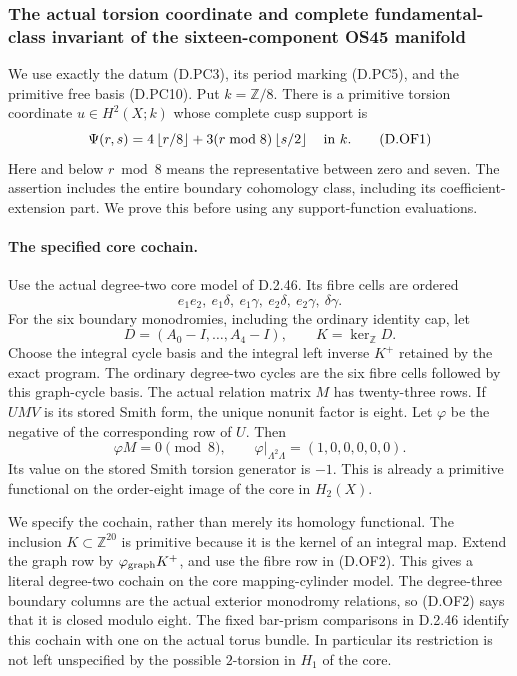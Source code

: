 \subsubsection*{The actual torsion coordinate and complete fundamental-class
invariant of the sixteen-component OS45 manifold}
We use exactly the datum (D.PC3), its period marking (D.PC5), and the
primitive free basis (D.PC10). Put \(k=\mathbb Z/8\).
There is a primitive torsion coordinate
\(u\in H^2(X;k)\) whose complete cusp support is
\[
 \Psi(r,s)=4\left\lfloor r/8\right\rfloor
       +3(r\bmod8)\left\lfloor s/2\right\rfloor
                                      \quad\hbox{in }k.       \tag{D.OF1}
\]
Here and below \(r\bmod8\) means the representative between zero and
seven. The assertion includes the entire boundary cohomology class,
including its coefficient-extension part. We prove this before using
any support-function evaluations.

\paragraph{The specified core cochain.}
Use the actual degree-two core model of D.2.46. Its fibre cells are
ordered
\[
 e_1e_2,\ e_1\delta,\ e_1\gamma,\ e_2\delta,\
                                      e_2\gamma,\ \delta\gamma.
\]
For the six boundary monodromies, including the ordinary identity cap,
let
\[
 D=(A_0-I,\ldots,A_4-I),\qquad K=\ker_{\mathbb Z}D.
\]
Choose the integral cycle basis and the integral left inverse \(K^+\)
retained by the exact program. The ordinary degree-two cycles are the
six fibre cells followed by this graph-cycle basis. The actual
relation matrix \(M\) has twenty-three rows. If
\(UMV\) is its stored Smith form, the unique nonunit factor is eight.
Let \(\varphi\) be the negative of the corresponding row of \(U\).
Then
\[
 \varphi M=0\pmod8,\qquad
 \varphi|_{\Lambda^2\Lambda}=(1,0,0,0,0,0).                \tag{D.OF2}
\]
Its value on the stored Smith torsion generator is \(-1\).
This is already a primitive functional on the order-eight image of
the core in \(H_2(X)\).

We specify the cochain, rather than merely its homology functional.
The inclusion \(K\subset\mathbb Z^{20}\) is primitive because it is
the kernel of an integral map. Extend the graph row by
\(\varphi_{\rm graph}K^+\), and use the fibre row in (D.OF2).
This gives a literal degree-two cochain on the core mapping-cylinder
model. The degree-three boundary columns are the actual exterior
monodromy relations, so (D.OF2) says that it is closed modulo eight.
The fixed bar-prism comparisons in D.2.46 identify this cochain with
one on the actual torus bundle. In particular its restriction is not
left unspecified by the possible \(2\)-torsion in \(H_1\) of the core.

